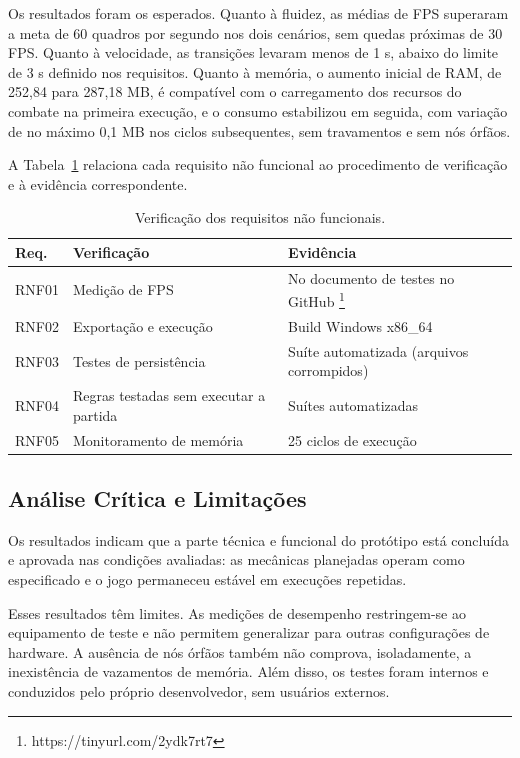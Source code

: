 Os resultados foram os esperados. Quanto à fluidez, as médias de FPS superaram a meta de 60 quadros por segundo nos dois cenários, sem quedas próximas de 30 FPS. Quanto à velocidade, as transições levaram menos de 1 s, abaixo do limite de 3 s definido nos requisitos. Quanto à memória, o aumento inicial de RAM, de 252,84 para 287,18 MB, é compatível com o carregamento dos recursos do combate na primeira execução, e o consumo estabilizou em seguida, com variação de no máximo 0,1 MB nos ciclos subsequentes, sem travamentos e sem nós órfãos.

A Tabela~\ref{tab:rnf} relaciona cada requisito não funcional ao procedimento de verificação e à evidência correspondente.

\begin{table}[!h]
\caption{Verificação dos requisitos não funcionais.}
\label{tab:rnf}
\centering
\footnotesize
\begin{tabular}{@{}p{0.9cm}p{3.1cm}p{3.5cm}@{}}
\hline
\textbf{Req.} & \textbf{Verificação} & \textbf{Evidência} \\
\hline
RNF01 & Medição de FPS & No documento de testes no GitHub \footnote{https://tinyurl.com/2ydk7rt7} \\
RNF02 & Exportação e execução & Build Windows x86\_64 \\
RNF03 & Testes de persistência & Suíte automatizada (arquivos corrompidos) \\
RNF04 & Regras testadas sem executar a partida & Suítes automatizadas \\
RNF05 & Monitoramento de memória & 25 ciclos de execução \\
\hline
\end{tabular}
\end{table}

\subsection{Análise Crítica e Limitações}
Os resultados indicam que a parte técnica e funcional do protótipo está concluída e aprovada nas condições avaliadas: as mecânicas planejadas operam como especificado e o jogo permaneceu estável em execuções repetidas.

Esses resultados têm limites. As medições de desempenho restringem-se ao equipamento de teste e não permitem generalizar para outras configurações de hardware. A ausência de nós órfãos também não comprova, isoladamente, a inexistência de vazamentos de memória. Além disso, os testes foram internos e conduzidos pelo próprio desenvolvedor, sem usuários externos.

